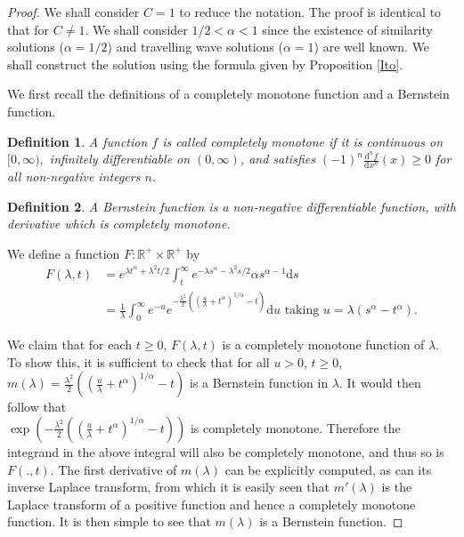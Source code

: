 \documentclass[10pt,a4paper]{amsart}
\newtheorem{definition}{Definition}
\begin{document}
\begin{proof}
We shall consider $C=1$ to reduce the notation. The proof is identical to that for $C\neq 1$. 
We shall consider $1/2<\alpha<1$ since the existence of similarity solutions ($\alpha=1/2$) and travelling wave solutions ($\alpha=1$) are well known. We shall construct the solution using the formula given by Proposition \ref{Ito}.

We first recall the definitions of a completely monotone function and a Bernstein function.
\begin{definition}
    A function $f$ is called completely monotone if it is continuous on $[0,\infty),$ infinitely differentiable on $(0,\infty)$, and satisfies $(-1)^n\frac{\textrm{d}^nf}{\textrm{d}x^n}(x)\geq 0$ for all non-negative integers $n$.
\end{definition}
\begin{definition}
    A Bernstein function is a non-negative differentiable function, with derivative which is completely monotone.
\end{definition}

We define a function $F:\mathbb{R}^+\times \mathbb{R^+}$ by
\begin{align*}
F(\lambda,t)&=e^{\lambda t^\alpha+\lambda^2t/2}\int_t^\infty e^{-\lambda s^\alpha-\lambda^2s/2}\alpha s^{\alpha-1}\textrm{d}s\\
    &=\frac{1}{\lambda}\int_0^\infty e^{-u}e^{-\frac{\lambda^2}{2}((\frac{u}{\lambda}+t^\alpha)^{1/\alpha}-t)} \textrm{d}u \textrm{ taking }u=\lambda(s^\alpha-t^\alpha).
\end{align*}

We claim that for each $t\geq 0$, $F(\lambda,t)$ is a completely monotone function of $\lambda$. To show this, it is sufficient to check that for all $u>0$, $t\geq 0$, \\$m( \lambda)=\frac{\lambda^2}{2}((\frac{u}{\lambda}+t^\alpha)^{1/\alpha}-t)$ is a Bernstein function in $\lambda$. It would then follow that
\\$\exp\left(-\frac{\lambda^2}{2}((\frac{u}{\lambda}+t^\alpha)^{1/\alpha}-t)\right)$ is completely monotone. Therefore the integrand in the above integral will also be completely monotone, and thus so is $F(.,t)$. The first derivative of $m(\lambda)$ can be explicitly computed, as can its inverse Laplace transform, from which it is easily seen that $m'(\lambda)$ is the Laplace transform of a positive function and hence a completely monotone function. It is then simple to see that $m(\lambda)$ is a Bernstein function.



\end{proof}
\end{document}
